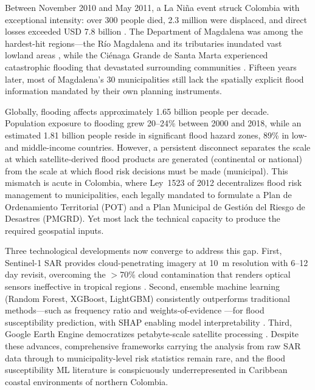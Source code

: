 \documentclass{article}
\begin{document}
Between November 2010 and May 2011, a La Ni\~na event struck Colombia with exceptional intensity: over 300 people died, 2.3 million were displaced, and direct losses exceeded USD 7.8 billion \citep{Hoyos2013}. The Department of Magdalena was among the hardest-hit regions---the R\'io Magdalena and its tributaries inundated vast lowland areas \citep{Restrepo2006, Restrepo2014}, while the Ci\'enaga Grande de Santa Marta experienced catastrophic flooding that devastated surrounding communities \citep{UNGRD2012}. Fifteen years later, most of Magdalena's 30 municipalities still lack the spatially explicit flood information mandated by their own planning instruments.

Globally, flooding affects approximately 1.65 billion people per decade. Population exposure to flooding grew 20--24\% between 2000 and 2018, while an estimated 1.81 billion people reside in significant flood hazard zones, 89\% in low- and middle-income countries. However, a persistent disconnect separates the scale at which satellite-derived flood products are generated (continental or national) from the scale at which flood risk decisions must be made (municipal). This mismatch is acute in Colombia, where Ley~1523 of 2012 decentralizes flood risk management to municipalities, each legally mandated to formulate a Plan de Ordenamiento Territorial (POT) and a Plan Municipal de Gesti\'on del Riesgo de Desastres (PMGRD). Yet most lack the technical capacity to produce the required geospatial inputs.

Three technological developments now converge to address this gap. First, Sentinel-1 SAR \citep{Torres2012} provides cloud-penetrating imagery at \SI{10}{\metre} resolution with 6--12 day revisit, overcoming the $>$70\% cloud contamination that renders optical sensors ineffective in tropical regions \citep{Twele2016, Uddin2019}. Second, ensemble machine learning (Random Forest, XGBoost, LightGBM) consistently outperforms traditional methods---such as frequency ratio and weights-of-evidence \citep{Rahmati2016, Tehrany2019}---for flood susceptibility prediction, with SHAP enabling model interpretability \citep{Lundberg2017}. Third, Google Earth Engine democratizes petabyte-scale satellite processing \citep{Gorelick2017}. Despite these advances, comprehensive frameworks carrying the analysis from raw SAR data through to municipality-level risk statistics remain rare, and the flood susceptibility ML literature is conspicuously underrepresented in Caribbean coastal environments of northern Colombia.
\end{document}
